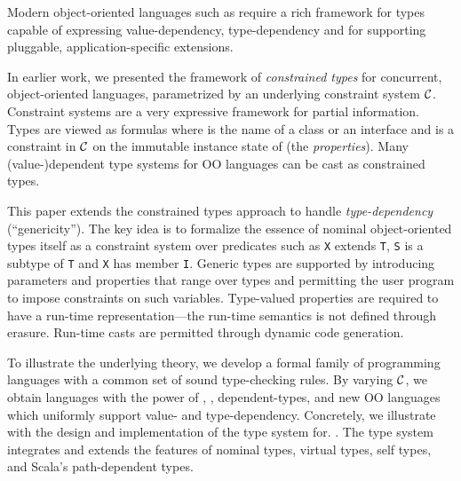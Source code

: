 
Modern object-oriented languages such as \Xten{} require a rich
framework for types capable of expressing value-dependency,
type-dependency and for supporting pluggable, application-specific
extensions.

In earlier work, we presented the framework of {\em constrained types}
for concurrent, object-oriented languages, parametrized by an
underlying constraint system $\cal C$. Constraint systems are a very
expressive framework for partial information. Types are viewed as
formulas  where  is the name of a class or an interface
and
 is a constraint in $\cal C$ on the immutable instance state of
 (the {\em properties}). Many (value-)dependent type systems
for OO languages can be cast as constrained types.

This paper extends the constrained types approach to handle
{\em type-dependency} (``genericity''). The key idea is to formalize the
essence of nominal object-oriented types itself as a constraint system
over predicates such as {\tt X} extends {\tt T}, {\tt S} is a subtype
of {\tt T} and {\tt X} has member {\tt I}. Generic types are supported
by introducing parameters and properties that range over types and
permitting the user program to impose constraints on such
variables. Type-valued properties are required to have a run-time
representation---the run-time semantics is not defined through
erasure. Run-time casts are permitted through dynamic code generation.

To illustrate the underlying theory, we develop a formal family
 of programming languages with a common set of sound
type-checking rules.  By varying $\cal C$, we obtain languages with
the power of \FJ, \FGJ, dependent-types, and new OO languages which
uniformly support value- and type-dependency.  Concretely, we
illustrate with the design and implementation of the type system for.
\Xten{}.  The type system integrates and extends the features of
nominal types, virtual types, self types, and Scala's path-dependent
types.

